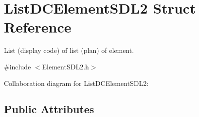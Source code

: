 \hypertarget{structListDCElementSDL2}{}\section{List\+D\+C\+Element\+S\+D\+L2 Struct Reference}
\label{structListDCElementSDL2}


List (display code) of list (plan) of element.  




{\ttfamily \#include $<$Element\+S\+D\+L2.\+h$>$}



Collaboration diagram for List\+D\+C\+Element\+S\+D\+L2\+:
\subsection*{Public Attributes}

